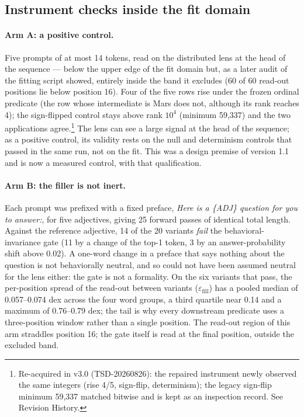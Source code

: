 \documentclass[11pt]{article}
\begin{document}
\subsection{Instrument checks inside the fit domain}

\label{sec:arms}

\paragraph{Arm A: a positive control.} Five prompts of at most 14 tokens, read on the distributed lens at the head of the sequence --- below the upper edge of the fit domain but, as a later audit of the fitting script showed, entirely inside the band it excludes (60 of 60 read-out positions lie below position 16). Four of the five rows rise under the frozen ordinal predicate (the row whose intermediate is Mars does not, although its rank reaches 4); the sign-flipped control stays above rank $10^4$ (minimum 59{,}337) and the two applications agree.\footnote{Re-acquired in v3.0 (TSD-20260826): the repaired instrument newly observed the same integers (rise 4/5, sign-flip, determinism); the legacy sign-flip minimum 59{,}337 matched bitwise and is kept as an inspection record. See Revision History.} The lens can see a large signal at the head of the sequence; as a positive control, its validity rests on the null and determinism controls that passed in the same run, not on the fit. This was a design premise of version 1.1 and is now a measured control, with that qualification.

\paragraph{Arm B: the filler is not inert.} Each prompt was prefixed with a fixed preface, \emph{Here is a \{ADJ\} question for you to answer:}, for five adjectives, giving 25 forward passes of identical total length. Against the reference adjective, 14 of the 20 variants \emph{fail} the behavioral-invariance gate (11 by a change of the top-1 token, 3 by an answer-probability shift above 0.02). A one-word change in a preface that says nothing about the question is not behaviorally neutral, and so could not have been assumed neutral for the lens either: the gate is not a formality. On the six variants that pass, the per-position spread of the read-out between variants ($\varepsilon_{\mathrm{fill}}$) has a pooled median of 0.057--0.074 dex across the four word groups, a third quartile near 0.14 and a maximum of 0.76--0.79 dex; the tail is why every downstream predicate uses a three-position window rather than a single position. The read-out region of this arm straddles position 16; the gate itself is read at the final position, outside the excluded band.
\end{document}

